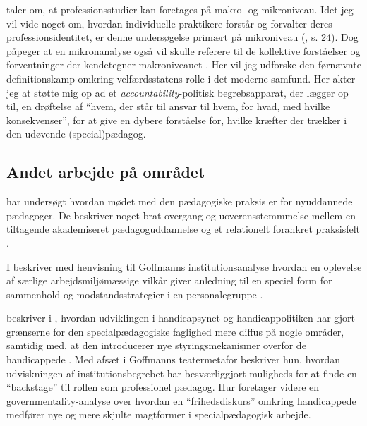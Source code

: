 \citeauthor{molanderProfesjonsstudierIntroduksjon2008} taler om, at  professionsstudier kan foretages på makro- og mikroniveau.
Idet jeg vil vide noget om, hvordan individuelle praktikere forstår og forvalter deres professionsidentitet, er denne undersøgelse primært på mikroniveau (\citeyear{molanderProfesjonsstudierIntroduksjon2008}, s. 24).
Dog påpeger \citeauthor{molanderProfesjonsstudierIntroduksjon2008} at en mikronanalyse også vil skulle referere til de kollektive forståelser og forventninger der kendetegner makroniveauet \autocite[s. 24]{molanderProfesjonsstudierIntroduksjon2008}.
Her vil jeg udforske den førnævnte definitionskamp omkring velfærdsstatens rolle i det moderne samfund.
Her akter jeg at støtte mig op ad et \textit{accountability}-politisk begrebsapparat, der lægger op til, en drøftelse af “hvem, der står til ansvar til hvem, for hvad, med hvilke konsekvenser”, for at give en dybere forståelse for, hvilke kræfter der trækker i den udøvende (special)pædagog.

\subsection{Andet arbejde på området}
\citeauthor{nielsenAttraktivPaPapiret2017} har undersøgt hvordan mødet med den pædagogiske praksis er for nyuddannede pædagoger. De beskriver noget brat overgang og uoverensstemmmelse mellem en tiltagende akademiseret pædagoguddannelse og et relationelt forankret praksisfelt \autocite{nielsenAttraktivPaPapiret2017}.

I  beskriver \citeauthor{dreyerespersenBekymrendeIdentiteterAnbragte2010} med henvisning til Goffmanns institutionsanalyse hvordan en oplevelse af særlige arbejdsmiljømæssige vilkår giver anledning til en speciel form for sammenhold og modstandsstrategier i en personalegruppe \autocite{dreyerespersenBekymrendeIdentiteterAnbragte2010}.

\citeauthor{hurFrigorelsensMagt2015} beskriver i , hvordan udviklingen i handicapsynet og handicappolitiken har gjort grænserne for den specialpædagogiske faglighed mere diffus på nogle områder, samtidig med, at den introducerer nye styringsmekanismer overfor de handicappede \autocite{hurFrigorelsensMagt2015}.
Med afsæt i Goffmanns teatermetafor beskriver hun, hvordan udviskningen af institutionsbegrebet har besværliggjort muligheds for at finde en “backstage” til rollen som professionel pædagog.
Hur foretager videre en governmentality-analyse over hvordan en “frihedsdiskurs” omkring handicappede medfører nye og mere skjulte magtformer i specialpædagogisk arbejde.

